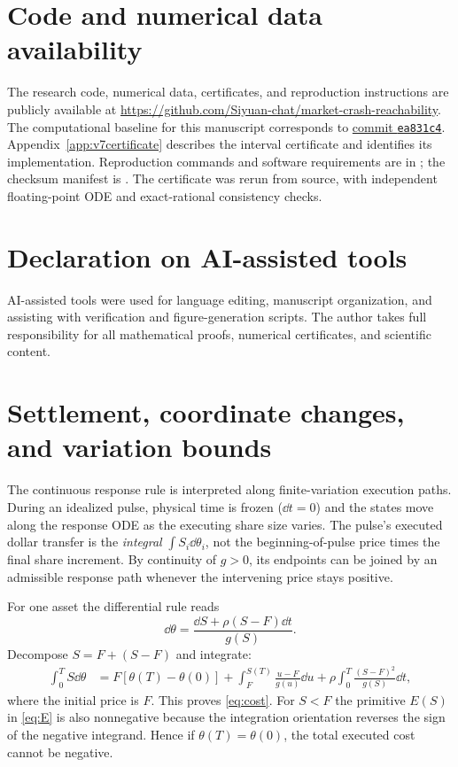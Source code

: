 \documentclass[review,hidelinks,onefignum,onetabnum]{siamonline250211}
\begin{document}
\section*{Code and numerical data availability}
The research code, numerical data, certificates, and reproduction instructions are publicly available at \url{https://github.com/Siyuan-chat/market-crash-reachability}. The computational baseline for this manuscript corresponds to \href{https://github.com/Siyuan-chat/market-crash-reachability/tree/ea831c44f5b77b7039dd6644f6f0a791bb74d176}{commit \texttt{ea831c4}}. Appendix~\ref{app:v7certificate} describes the interval certificate and identifies its implementation. Reproduction commands and software requirements are in ; the checksum manifest is . The certificate was rerun from source, with independent floating-point ODE and exact-rational consistency checks.

\section*{Declaration on AI-assisted tools}
AI-assisted tools were used for language editing, manuscript organization, and assisting with verification and figure-generation scripts. The author takes full responsibility for all mathematical proofs, numerical certificates, and scientific content.

\appendix
\section{Settlement, coordinate changes, and variation bounds}\label{app:accounting}
The continuous response rule is interpreted along finite-variation execution paths. During an idealized pulse, physical time is frozen ($\dd t=0$) and the states move along the response ODE as the executing share size varies. The pulse's executed dollar transfer is the \emph{integral} $\int S_i\dd\theta_i$, not the beginning-of-pulse price times the final share increment. By continuity of $g>0$, its endpoints can be joined by an admissible response path whenever the intervening price stays positive.

For one asset the differential rule reads
\begin{equation}\label{eq:appendix-s}
\dd\theta=\frac{\dd S+\rho(S-F)\dd t}{g(S)}.
\end{equation}
Decompose $S=F+(S-F)$ and integrate:
\begin{align*}
\int_0^T S\dd\theta
&=F[\theta(T)-\theta(0)]
+\int_F^{S(T)}\frac{u-F}{g(u)}\dd u
+\rho\int_0^T\frac{(S-F)^2}{g(S)}\dd t,
\end{align*}
where the initial price is $F$. This proves \eqref{eq:cost}. For $S<F$ the primitive $E(S)$ in \eqref{eq:E} is also nonnegative because the integration orientation reverses the sign of the negative integrand. Hence if $\theta(T)=\theta(0)$, the total executed cost cannot be negative.
\end{document}
